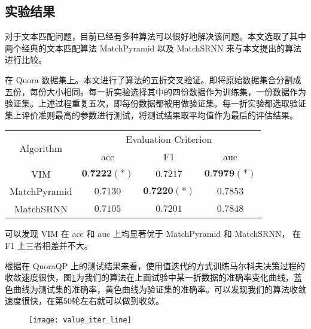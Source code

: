 \subsection{实验结果}
\label{sec:lab_value}
对于文本匹配问题，目前已经有多种算法可以很好地解决该问题。本文选取了其中两个经典的文本匹配算法 MatchPyramid\cite{Pang2016TextMA} 以及 MatchSRNN\cite{Wan2016MatchSRNNMT} 来与本文提出的算法进行比较。

在 Quora 数据集上。本文进行了算法的五折交叉验证。即将原始数据集合分割成五份，每份大小相同。每一折实验选择其中的四份数据作为训练集，一份数据作为验证集。上述过程重复五次，即每份数据都被用做验证集。每一折实验都选取验证集上评价准则最高的参数进行测试，将测试结果取平均值作为最后的评估结果。

\begin{table}[!htbp]
    \label{tab:MDP_test}
    \centering
    \footnotesize%
    \setlength{\tabcolsep}{4pt}%
    \renewcommand{\arraystretch}{1.2}%
    \begin{tabular}{cccc}
        \hline
        \multirow{2}{*}{Algorithm} &
        \multicolumn{3}{c}{\multirow{1}{*}{Evaluation Criterion}} \\
        \cline{2-4} & acc & F1 & auc \\
        \hline
        VIM & $\textbf{0.7222}(*)$ & $0.7217$ & $\textbf{0.7979}(*)$ \\
        MatchPyramid & $0.7130$ & $\textbf{0.7220}(*)$ & $0.7853$ \\
        MatchSRNN & $0.7105$ & $0.7201$ & $0.7848$\\
        \hline
    \end{tabular}
\end{table}

可以发现 VIM 在 acc 和 auc 上均显著优于 MatchPyramid 和 MatchSRNN， 在 F1 上三者相差并不大。

根据在 QuoraQP 上的测试结果来看，使用值迭代的方式训练马尔科夫决策过程的收敛速度很快，图\ref{fig:value_iter_line}为我们的算法在上面试验中某一折数据的准确率变化曲线，蓝色曲线为测试集的准确率，黄色曲线为验证集的准确率。可以发现我们的算法收敛速度很快，在第50轮左右就可以做到收敛。

\begin{figure}[H]
    \centering
    \texttt{[image: value\_iter\_line]}
    \label{fig:value_iter_line}
\end{figure}

